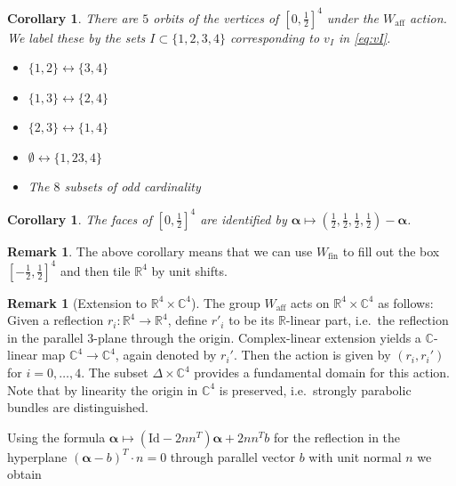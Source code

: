 \documentclass[12pt,letterpaper,reqno]{amsart}
\def\mathbf#1{#1}%
\newtheorem{cor}[thm]{Corollary}
\theoremstyle{remark}
\theoremstyle{definition}
\newtheorem{rem}[thm]{Remark}
\numberwithin{thm}{section}
\numberwithin{equation}{section}
\numberwithin{figure}{section}
\newcommand{\R}{\ensuremath{\mathbb R}}
\newcommand{\C}{\ensuremath{\mathbb C}}
\newcommand{\Simplex}{\Delta}
\begin{document}
\begin{cor}\label{cor:orbits} 
There are $5$ orbits of the vertices of $[0, \frac{1}{2}]^4$ under the $W_{\mathrm{aff}}$ action. We label these by the sets $I \subset \{1, 2, 3, 4\}$ corresponding to $v_I$ in \eqref{eq:vI}.
\begin{itemize}
\item $\{1, 2\} \leftrightarrow \{3, 4\}$
\item $\{1, 3\} \leftrightarrow \{2, 4\}$
\item $\{2, 3\} \leftrightarrow \{1, 4\}$
\item $\emptyset \leftrightarrow \{1,2 3, 4\}$
\item The $8$ subsets of odd cardinality
\end{itemize}
\end{cor}
\begin{cor}
The faces of $[0, \frac{1}{2}]^4$ are identified by $\boldsymbol{\alpha} \mapsto (\frac{1}{2}, \frac{1}{2}, \frac{1}{2}, \frac{1}{2})-\boldsymbol{\alpha}$.
\end{cor}

\begin{rem}\label{rem:Wallextension}
The above corollary means that we can use $W_{\mathrm{fin}}$ to fill out the box $[-\frac{1}{2}, \frac{1}{2}]^4$ and then tile $\R^4$ by unit shifts. 
\end{rem}

\begin{rem}[Extension to $\R^4 \times \C^4$]\label{rem:extension}
The group $W_{\mathrm{aff}}$ acts on $\R^4 \times \C^4$ as follows: Given a reflection $r_i: \R^4 \to \R^4$, define $r'_i$ to be its $\R$-linear part, i.e.\ the reflection in the parallel $3$-plane through the origin. Complex-linear extension yields a $\C$-linear map $\C^4 \to \C^4$, again denoted by $r_i'$. Then the action is given by $(r_i, r_i')$ for $i=0, \ldots, 4$. The subset $\Simplex \times \C^4$ provides a fundamental domain for this action. Note that by linearity the origin in $\C^4$ is preserved, i.e.\ strongly parabolic bundles are distinguished. 
\end{rem}

Using the formula $\boldsymbol{\alpha} \mapsto (\mathrm{Id} - 2 \mathbf{n} \mathbf{n}^T) \boldsymbol{\alpha} + 2 \mathbf{n} \mathbf{n}^T \mathbf{b}$ for the reflection in the hyperplane $(\boldsymbol{\alpha} - \mathbf{b})^T \cdot  \mathbf{n}=0$ through parallel vector $\mathbf{b}$ with unit normal $\mathbf{n}$ we obtain 
\end{document}
